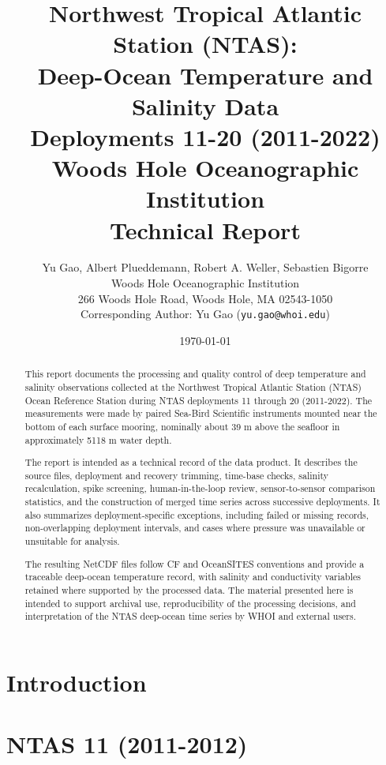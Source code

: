 \documentclass[12pt]{report}
\title{
    \textbf{Northwest Tropical Atlantic Station (NTAS):\\
    Deep-Ocean Temperature and Salinity Data\\
    Deployments 11-20 (2011-2022)}\\
    \vspace{1cm}
    \large Woods Hole Oceanographic Institution\\
    Technical Report
}
\author{
    Yu Gao, Albert Plueddemann, Robert A. Weller, Sebastien Bigorre\\
    Woods Hole Oceanographic Institution\\
    266 Woods Hole Road, Woods Hole, MA 02543-1050\\
    Corresponding Author: Yu Gao (\texttt{yu.gao@whoi.edu})
}
\date{\today}
\begin{document}
\maketitle

\begin{abstract}
This report documents the processing and quality control of deep temperature and salinity observations collected at the Northwest Tropical Atlantic Station (NTAS) Ocean Reference Station during NTAS deployments 11 through 20 (2011-2022). The measurements were made by paired Sea-Bird Scientific instruments mounted near the bottom of each surface mooring, nominally about 39 m above the seafloor in approximately 5118 m water depth.

The report is intended as a technical record of the data product. It describes the source files, deployment and recovery trimming, time-base checks, salinity recalculation, spike screening, human-in-the-loop review, sensor-to-sensor comparison statistics, and the construction of merged time series across successive deployments. It also summarizes deployment-specific exceptions, including failed or missing records, non-overlapping deployment intervals, and cases where pressure was unavailable or unsuitable for analysis.

The resulting NetCDF files follow CF and OceanSITES conventions and provide a traceable deep-ocean temperature record, with salinity and conductivity variables retained where supported by the processed data. The material presented here is intended to support archival use, reproducibility of the processing decisions, and interpretation of the NTAS deep-ocean time series by WHOI and external users.
\end{abstract}

\setcounter{tocdepth}{1}


\tableofcontents

\chapter{Introduction}


\chapter{NTAS 11 (2011-2012)}

\end{document}
